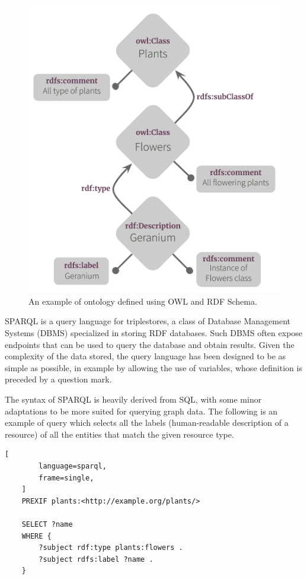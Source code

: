 \documentclass[%
    corpo=13.5pt,
    twoside,
    oldstyle,
    tipotesi=magistrale,
    greek,
    evenboxes
]{toptesi}
\begin{document}
\begin{figure}[ht]
\centering
\includegraphics[scale=0.6]{img/owl-ontology-example.png}
\caption{An example of ontology defined using OWL and RDF Schema.}
\label{fig:owl-ontology-example}
\end{figure}

SPARQL is a query language for triplestores, a class of Database
Management Systems (DBMS) specialized in storing RDF databases. Such DBMS
often expose endpoints that can be used to query the database and obtain
results. Given the complexity of the data stored, the query language has
been designed to be as simple as possible, in example by allowing the use
of variables, whose definition is preceded by a question mark.

The syntax of SPARQL is heavily derived from SQL, with some
minor adaptations to be more suited for querying graph data. The
following is an example of query which selects all the labels
(human-readable description of a resource) of all the entities that
match the given resource type.

\begin{lstlisting}[
        language=sparql,
        frame=single,
    ]
    PREXIF plants:<http://example.org/plants/>

    SELECT ?name
    WHERE {
        ?subject rdf:type plants:flowers .
        ?subject rdfs:label ?name .
    }
\end{lstlisting}
\end{document}
